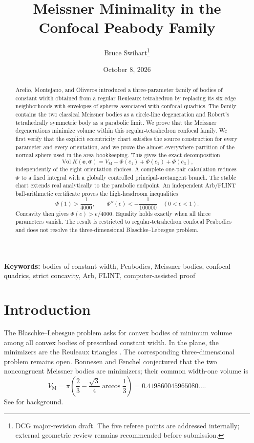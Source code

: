 \documentclass[11pt]{article}
\title{Meissner Minimality in the Confocal Peabody Family}
\author{Bruce Swihart\thanks{DCG major-revision draft.  The five referee points are addressed internally; external geometric review remains recommended before submission.}}
\date{October 8, 2026}
\numberwithin{equation}{section}
\theoremstyle{remark}
\newcommand{\Vol}{\operatorname{Vol}}
\newcommand{\VM}{V_{\mathrm M}}
\begin{document}
\maketitle

\begin{abstract}
Arelio, Montejano, and Oliveros introduced a three-parameter family of bodies of constant width obtained from a regular Reuleaux tetrahedron by replacing its six edge neighborhoods with envelopes of spheres associated with confocal quadrics.  The family contains the two classical Meissner bodies as a circle-line degeneration and Robert's tetrahedrally symmetric body as a parabolic limit.  We prove that the Meissner degenerations minimize volume within this regular-tetrahedron confocal family.  We first verify that the explicit eccentricity chart satisfies the source construction for every parameter and every orientation, and we prove the almost-everywhere partition of the normal sphere used in the area bookkeeping.  This gives the exact decomposition
\[
  \Vol K(\mathbf e,\boldsymbol\sigma)
  =\VM+\Phi(e_1)+\Phi(e_2)+\Phi(e_3),
\]
independently of the eight orientation choices.  A complete one-pair calculation reduces \(\Phi\) to a fixed integral with a globally controlled principal-arctangent branch.  The stable chart extends real analytically to the parabolic endpoint.  An independent Arb/FLINT ball-arithmetic certificate proves the high-headroom inequalities
\[
  \Phi(1)>\frac1{4000},
  \qquad
  \Phi''(e)<-\frac1{100000}\quad(0<e<1).
\]
Concavity then gives \(\Phi(e)>e/4000\).  Equality holds exactly when all three parameters vanish.  The result is restricted to regular-tetrahedron confocal Peabodies and does not resolve the three-dimensional Blaschke--Lebesgue problem.
\end{abstract}

\noindent\textbf{Keywords:} bodies of constant width, Peabodies, Meissner bodies, confocal quadrics, strict concavity, Arb, FLINT, computer-assisted proof

\section{Introduction}

The Blaschke--Lebesgue problem asks for convex bodies of minimum volume among all convex bodies of prescribed constant width.  In the plane, the minimizers are the Reuleaux triangles \cite{Blaschke1915,Lebesgue1914}.  The corresponding three-dimensional problem remains open.  Bonnesen and Fenchel conjectured that the two noncongruent Meissner bodies are minimizers; their common width-one volume is
\begin{equation}
  \VM
  =\pi\left(\frac23-\frac{\sqrt3}{4}\arccos\frac13\right)
  =0.419860045965080\ldots .
  \label{eq:meissner-volume}
\end{equation}
See \cite{KawohlWeber2011,MartiniMontejanoOliveros2019,Nishioka2026} for background.
\end{document}
